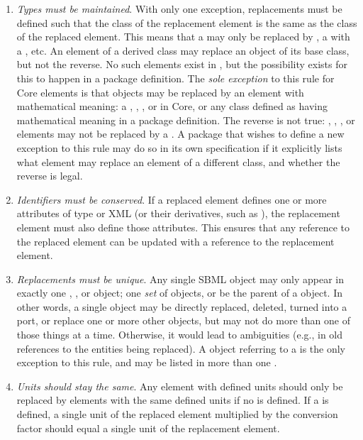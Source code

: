 \begin{enumerate}

\item \emph{Types must be maintained}.  With only one exception, replacements must be defined such that the class of the replacement element is the same as the class of the replaced element.  This means that a \Species may only be replaced by \Species, a \Reaction with a \Reaction, etc.  An element of a derived class may replace an object of its base class, but not the reverse.  No such elements exist in \sbmlthreecore, but the possibility exists for this to happen in a package definition.  The \emph{sole exception} to this rule for Core elements is that \Parameter objects may be replaced by an element with mathematical meaning: a \Compartment, \Reaction, \Species, or \SpeciesReference in Core, or any class defined as having mathematical meaning in a package definition.  The reverse is not true: \Compartment, \Reaction, \Species, or \SpeciesReference elements may not be replaced by a \Parameter.  A package that wishes to define a new exception to this rule may do so in its own specification if it explicitly lists what element may replace an element of a different class, and whether the reverse is legal.

\item \emph{Identifiers must be conserved}.  If a replaced element defines one or more attributes of type  or XML  (or their derivatives, such as ), the replacement element must also define those attributes.  This ensures that any reference to the replaced element can be updated with a reference to the replacement element.

\item \emph{Replacements must be unique}.  Any single SBML object may only appear in exactly one \ReplacedElement,  \Port, or \Deletion object; one \emph{set} of \ReplacedBy objects, or be the parent of a \ReplacedBy object.  In other words, a single object may be directly replaced, deleted, turned into a port, or replace one or more other objects, but may not do more than one of those things at a time.  Otherwise, it would lead to ambiguities (e.g., in old references to the entities being replaced). A \ReplacedElement object referring to a \Deletion is the only exception to this rule,  and may be listed in more than one \ListOfReplacedElements.

\item \emph{Units should stay the same}.  Any element with defined units should only be replaced by elements with the same defined units if no  is defined.  If a  is defined, a single unit of the replaced element multiplied by the conversion factor should equal a single unit of the replacement element.


\end{enumerate}
